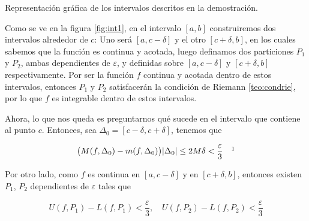 \begin{marginfigure}
    \caption{\footnotesize Representación gráfica de los intervalos descritos en la demostración.}
    \label{fig:int1}
\end{marginfigure}

Como se ve en la figura \ref{fig:int1}, en el intervalo $[a,b]$ construiremos dos intervalos alrededor de $c$: Uno será $[a,c-\delta]$ y el otro $[c+\delta,b]$, en los cuales sabemos que la función es continua y acotada, luego definamos dos particiones $P_1$ y $P_2$, ambas dependientes de $\varepsilon$, y definidas sobre $[a,c-\delta]$ y $[c+\delta,b]$ respectivamente. Por ser la función $f$ continua y acotada dentro de estos intervalos, entonces $P_1$ y $P_2$ satisfacerán la condición de Riemann \ref{teo:condrie}, por lo que $f$ es integrable dentro de estos intervalos.

Ahora, lo que nos queda es preguntarnos qué sucede en el intervalo que contiene al punto $c$. Entonces, sea $\Delta_0 = [c-\delta, c+\delta]$, tenemos que

\[
\big( M(f, \Delta_0) - m(f, \Delta_0) \big)|\Delta_0| \leq 2M\delta < \frac{\varepsilon}{3} \quad \footnotemark
\]

Por otro lado, como $f$ es continua en $[a,c-\delta]$ y en $[c+\delta,b]$, entonces existen $P_1$, $P_2$ dependientes de $\varepsilon$ tales que

\[
U(f, P_1) - L(f,P_1) < \frac{\varepsilon}{3}, \quad U(f, P_2) - L(f,P_2) < \frac{\varepsilon}{3}
\]

